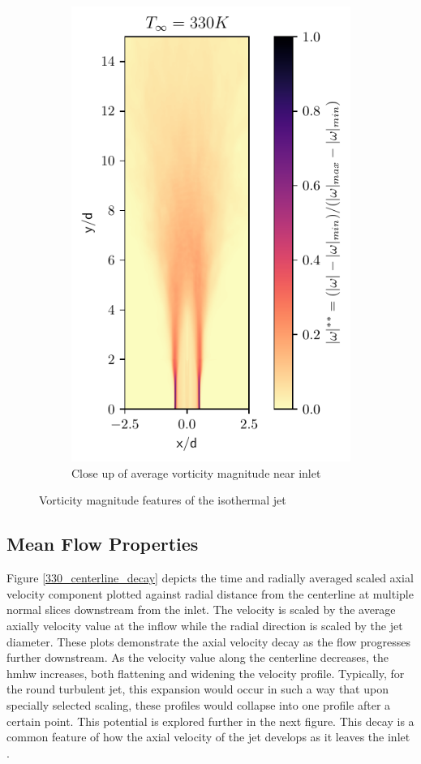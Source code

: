 \begin{figure}[htbp!]
\begin{subfigure}{0.25\textwidth}
	\includegraphics[scale=.65]{figures/Plots/vertical/330/magvort_scaled_vert_avg_330_zoom.pdf}
	\caption{Close up of average vorticity magnitude near inlet} \label{330_magvort_4}
\end{subfigure}
\caption{Vorticity magnitude features of the isothermal jet}
\label{330_magvort_features}
\end{figure}

\subsection{Mean Flow Properties}
Figure \ref{330_centerline_decay} depicts the time and radially averaged scaled axial velocity component plotted against radial distance from the centerline at multiple normal slices downstream from the inlet. The velocity is scaled by the average axially velocity value at the inflow while the radial direction is scaled by the jet diameter. These plots demonstrate the axial velocity decay as the flow progresses further downstream. As the velocity value along the centerline decreases, the \gls{hmhw} increases, both flattening and widening the velocity profile. Typically, for the round turbulent jet, this expansion would occur in such a way that upon specially selected scaling, these profiles would collapse into one profile after a certain point. This potential is explored further in the next figure. This decay is a common feature of how the axial velocity of the jet develops as it leaves the inlet \cite{Pope}. 

